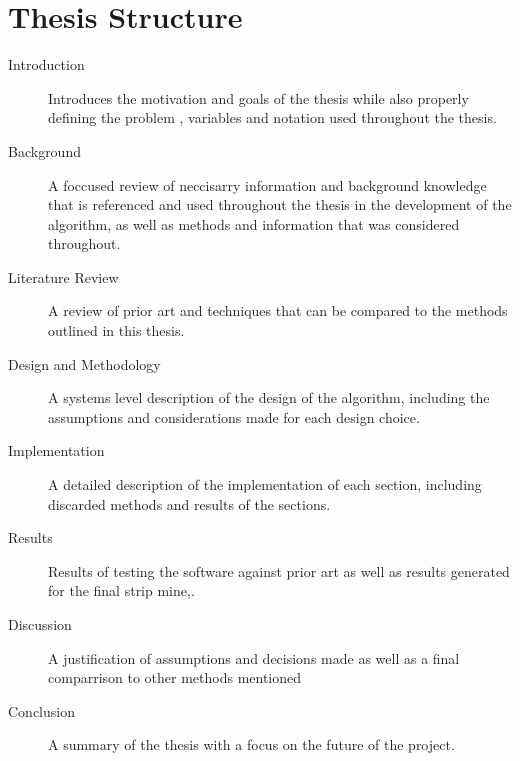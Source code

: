 \section{Thesis Structure}
\begin{description}
    \item[Introduction] Introduces the motivation and goals of the thesis while also properly defining the problem , variables and notation used throughout the thesis.
    \item[Background] A foccused review of neccisarry information and background knowledge that is referenced and used throughout the thesis in the development of the algorithm, as well as methods and information that was considered throughout. 
    \item[Literature Review] A review of prior art and techniques that can be compared to the methods outlined in this thesis.
    \item[Design and Methodology] A systems level description of the design of the algorithm, including the assumptions and considerations made for each design choice.
    \item[Implementation] A detailed description of the implementation of each section, including discarded methods and results of the sections.
    \item[Results] Results of testing the software against prior art as well as results generated for the final strip mine,.
    \item[Discussion] A justification of assumptions and decisions made as well as a final comparrison to other methods mentioned 
    \item[Conclusion] A summary of the thesis with a focus on the future of the project. 
\end{description}